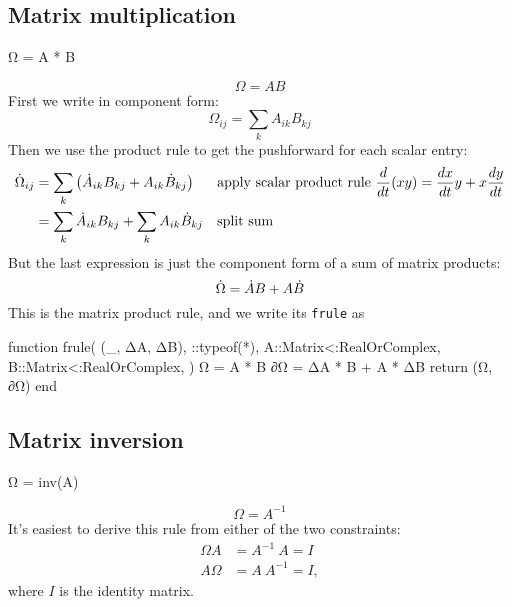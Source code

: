 \documentclass[../main.tex]{subfiles}
\begin{document}
\begin{refsection}
\subsection{Matrix multiplication}\label{matrix-multiplication}
\begin{juliacode}
Ω = A * B
\end{juliacode}
\[\Omega = A B\]
First we write in component form:
\[\Omega_{ij} = \sum_k A_{ik} B_{kj}\]
Then we use the product rule to get the pushforward for each scalar entry:
\begin{align*}
\dot{\Omega}_{ij}
    &= \sum_k \left( \dot{A}_{ik} B_{kj} + A_{ik} \dot{B}_{kj} \right)
        && \text{apply scalar product rule }
            \frac{d}{dt}(x y) = \frac{dx}{dt} y + x \frac{dy}{dt} \\
    &= \sum_k \dot{A}_{ik} B_{kj} + \sum_k A_{ik} \dot{B}_{kj}
        && \text{split sum}
\end{align*}
But the last expression is just the component form of a sum of matrix products:
\begin{equation}\label{diffprod}
\dot{\Omega} = \dot{A} B + A \dot{B}
\end{equation}
This is the matrix product rule, and we write its \texttt{frule} as
\begin{juliacode}
function frule(
    (_, ΔA, ΔB),
    ::typeof(*),
    A::Matrix{<:RealOrComplex},
    B::Matrix{<:RealOrComplex},
)
    Ω = A * B
    ∂Ω = ΔA * B + A * ΔB
    return (Ω, ∂Ω)
end
\end{juliacode}
\subsection{Matrix inversion}\label{matrix-inversion}
\begin{juliacode}
Ω = inv(A)
\end{juliacode}
\[\Omega = A^{-1}\]
It's easiest to derive this rule from either of the two constraints:
\begin{align*}
\Omega A &= A^{-1} ~A = I\\
A \Omega &= A~ A^{-1} = I,
\end{align*}
where $I$ is the identity matrix.


\end{refsection}
\end{document}

